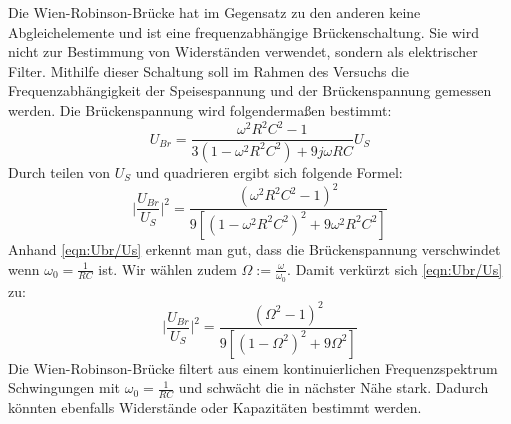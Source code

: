 Die Wien-Robinson-Brücke hat im Gegensatz zu den anderen keine Abgleichelemente und ist eine frequenzabhängige Brückenschaltung. Sie wird
nicht zur Bestimmung von Widerständen verwendet, sondern als elektrischer Filter. Mithilfe dieser Schaltung soll im Rahmen des Versuchs die
Frequenzabhängigkeit der Speisespannung und der Brückenspannung gemessen werden.
Die Brückenspannung wird folgendermaßen bestimmt:
\begin{equation}
    U_{Br} = \frac{\omega ^2 R^2 C^2 - 1}{3(1- \omega ^2 R^2 C^2) + 9 j \omega RC}U_S
\end{equation}
Durch teilen von $U_S$ und quadrieren ergibt sich folgende Formel:
\begin{equation}
    \biggl|\frac{U_{Br}}{U_S}\biggl|^2 = \frac{(\omega ^2 R^2 C^2 - 1)^2}{9[(1- \omega ^2 R^2 C^2)^2 + 9 \omega^2 R^2C^2]} \label{eqn:Ubr/Us}
\end{equation}
Anhand \autoref{eqn:Ubr/Us} erkennt man gut, dass die Brückenspannung verschwindet wenn $\omega_0 = \frac{1}{RC}$ ist. Wir wählen zudem $\Omega := \frac{\omega}{\omega_0}$.
Damit verkürzt sich \autoref{eqn:Ubr/Us} zu:
\begin{equation}
    \biggl|\frac{U_{Br}}{U_S}\biggl|^2 = \frac{(\Omega ^2 - 1)^2}{9[(1-\Omega ^2)^2 + 9 \Omega ^2]} \label{eqn:Omega}
\end{equation}
Die Wien-Robinson-Brücke filtert aus einem kontinuierlichen Frequenzspektrum Schwingungen mit $\omega_0 = \frac{1}{RC}$ und schwächt die in nächster Nähe stark. Dadurch
könnten ebenfalls Widerstände oder Kapazitäten bestimmt werden.

